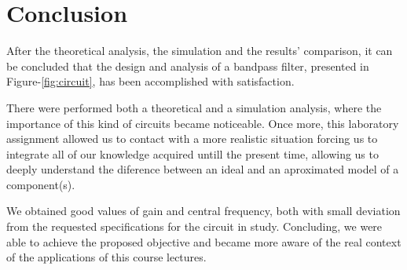 \section{Conclusion}
\label{sec:conclusion}

After the theoretical analysis, the simulation and the results' comparison, it can be
concluded that the design and analysis of a bandpass filter, presented in Figure-\ref{fig:circuit},
has been accomplished with satisfaction.\par
There were performed both a theoretical and a simulation analysis, where the importance of this
kind of circuits became noticeable. Once more, this laboratory assignment allowed us to contact with
a more realistic situation forcing us to integrate all of our knowledge acquired untill
the present time, allowing us to deeply understand the diference between an ideal and an aproximated
model of a component(s).\par
We obtained good values of gain and central frequency, both with small deviation from the
requested specifications for the circuit in study.
Concluding, we were able to achieve the proposed objective and became more aware of the real context
of the applications of this course lectures.
